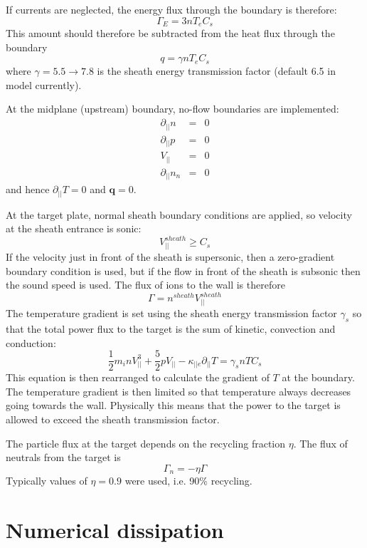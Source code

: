 \documentclass[12pt,a4paper]{article}
\begin{document}
If currents are neglected, the energy flux through the boundary is therefore:
\[
\Gamma_E = 3nT_eC_s
\]
This amount should therefore be subtracted from the heat flux through the boundary
\[
q = \gamma nT_e C_s
\]
where $\gamma = 5.5 \rightarrow 7.8$ is the sheath energy transmission factor (default 6.5 in model currently).

At the midplane (upstream) boundary, no-flow boundaries are implemented:
\begin{eqnarray}
  \partial_{||}n &=& 0 \\
  \partial_{||}p &=& 0 \nonumber \\
  V_{||} &=& 0 \nonumber \\
  \partial_{||}n_n &=& 0 \nonumber
\end{eqnarray}
and hence $\partial_{||}T = 0$ and $\mathbf{q} = 0$.

At the target plate, normal sheath boundary conditions are applied, so velocity at the sheath entrance
is sonic:
\begin{equation}
V_{||}^{sheath} \ge C_s
\end{equation}
If the velocity just in front of the sheath is supersonic, then a zero-gradient boundary condition is used, but if
the flow in front of the sheath is subsonic then the sound speed is used. The flux of ions to the wall is therefore 
\begin{equation}
\Gamma = n^{sheath}V_{||}^{sheath}
\end{equation}
The temperature gradient is set using the sheath energy transmission factor $\gamma_s$ so 
that the total power flux to the target is the sum of kinetic, convection and conduction:
\begin{equation}
\frac{1}{2}m_inV_{||}^3  + \frac{5}{2}pV_{||} - \kappa_{||e}\partial_{||}T = \gamma_s nTC_s
\end{equation}
This equation is then rearranged to calculate the gradient of $T$ at the boundary. 
The temperature gradient is then limited so that temperature always decreases going
towards the wall. Physically this means that the power to the target is allowed to exceed the sheath
transmission factor.

The particle flux at the target depends on the recycling fraction $\eta$. The flux of neutrals from
the target is 
\[
\Gamma_n = -\eta \Gamma
\]
Typically values of $\eta = 0.9$ were used, i.e. 90\% recycling. 

\section{Numerical dissipation}
\label{sec:dissipation}
\end{document}
